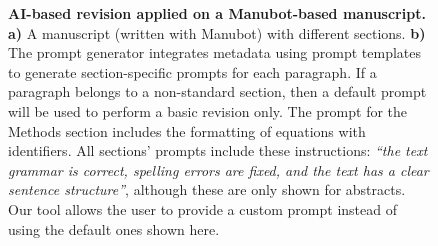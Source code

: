 \documentclass[
]{article}
\providecommand{\DIFaddend}{} %
\providecommand{\DIFaddbeginFL}{} %
\providecommand{\DIFaddendFL}{} %
\providecommand{\DIFdelbeginFL}{} %
\providecommand{\DIFdelendFL}{} %
\newcommand{\DIFscaledelfig}{0.5}
\newlength{\DIFdelgraphicswidth} %
\newlength{\DIFdelgraphicsheight} %
\newcommand{\DIFaddincludegraphics}[2][]{{\color{blue}\fbox{\DIFOincludegraphics[#1]{#2}}}} %
\newcommand{\DIFdelincludegraphics}[2][]{%
\sbox{\DIFdelgraphicsbox}{\DIFOincludegraphics[#1]{#2}}%
\settoboxwidth{\DIFdelgraphicswidth}{\DIFdelgraphicsbox} %
\settoboxtotalheight{\DIFdelgraphicsheight}{\DIFdelgraphicsbox} %
\scalebox{\DIFscaledelfig}{%
\parbox[b]{\DIFdelgraphicswidth}{\usebox{\DIFdelgraphicsbox}\\[-\baselineskip] \rule{\DIFdelgraphicswidth}{0em}}\llap{\resizebox{\DIFdelgraphicswidth}{\DIFdelgraphicsheight}{%
\setlength{\unitlength}{\DIFdelgraphicswidth}%
\begin{picture}(1,1)%
\thicklines\linethickness{2pt} %
{\color[rgb]{1,0,0}\put(0,0){\framebox(1,1){}}}%
{\color[rgb]{1,0,0}\put(0,0){\line( 1,1){1}}}%
{\color[rgb]{1,0,0}\put(0,1){\line(1,-1){1}}}%
\end{picture}%
}\hspace*{3pt}}} %
} %
\DeclareRobustCommand{\DIFaddend}{\DIFOaddend \let\includegraphics\DIFOincludegraphics} %
\DeclareRobustCommand{\DIFaddbeginFL}{\DIFOaddbeginFL \let\includegraphics\DIFaddincludegraphics} %
\DeclareRobustCommand{\DIFaddendFL}{\DIFOaddendFL \let\includegraphics\DIFOincludegraphics} %
\DeclareRobustCommand{\DIFdelbeginFL}{\DIFOdelbeginFL \let\includegraphics\DIFdelincludegraphics} %
\DeclareRobustCommand{\DIFdelendFL}{\DIFOaddendFL \let\includegraphics\DIFOincludegraphics} %
\begin{document}
\DIFaddend \begin{figure}
\DIFdelbeginFL %
\DIFdelendFL \DIFaddbeginFL \hypertarget{fig:ai_revision}{%
\centering

\caption{\textbf{AI-based revision applied on a Manubot-based manuscript.}
\textbf{a)} A manuscript (written with Manubot) with different sections.
\textbf{b)} The prompt generator integrates metadata using prompt templates to generate section-specific prompts for each paragraph.
If a paragraph belongs to a non-standard section, then a default prompt will be used to perform a basic revision only.
The prompt for the Methods section includes the formatting of equations with identifiers.
All sections' prompts include these instructions: \emph{``the text grammar is correct, spelling errors are fixed, and the text has a clear sentence structure''}, although these are only shown for abstracts.
Our tool allows the user to provide a custom prompt instead of using the default ones shown here.}\label{fig:ai_revision}
}
\DIFaddendFL \end{figure}
\end{document}
